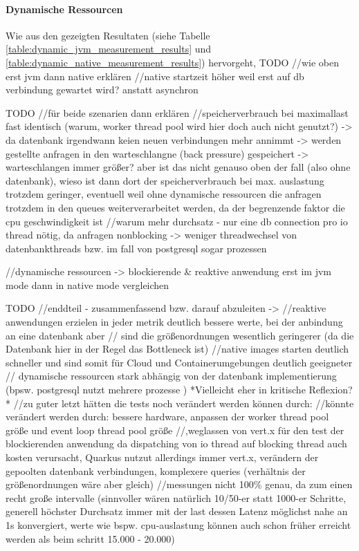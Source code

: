 \paragraph{Dynamische Ressourcen}
Wie aus den gezeigten Resultaten (siehe Tabelle \ref{table:dynamic_jvm_measurement_results} und
\ref{table:dynamic_native_measurement_results}) hervorgeht,
TODO
//wie oben erst jvm dann native erklären
//native startzeit höher weil erst auf db verbindung gewartet wird? anstatt asynchron

TODO
//für beide szenarien dann erklären
//speicherverbrauch bei maximallast fast identisch (warum, worker thread pool wird hier doch auch nicht genutzt?)
-> da datenbank irgendwann keien neuen verbindungen mehr annimmt -> werden gestellte anfragen in den warteschlangne (back pressure)
gespeichert -> warteschlangen immer größer? aber ist das nicht genauso oben der fall (also ohne datenbank), wieso ist dann
dort der speicherverbrauch bei max. auslastung trotzdem geringer, eventuell weil ohne dynamische ressourcen die anfragen
trotzdem in den queues weiterverarbeitet werden, da der begrenzende faktor die cpu geschwindigkeit ist
//warum mehr durchsatz - nur eine db connection pro io thread nötig, da anfragen nonblocking -> weniger threadwechsel
von datenbankthreads bzw. im fall von postgresql sogar prozessen


//dynamische ressourcen -> blockierende \& reaktive anwendung erst im jvm mode dann in native mode vergleichen

TODO
//enddteil - zusammenfassend bzw. darauf abzuleiten ->
//reaktive anwendungen erzielen in jeder metrik deutlich bessere werte, bei der anbindung an eine datenbank aber
// sind die größenordnungen wesentlich geringerer (da die Datenbank hier in der Regel das Bottleneck ist)
//native images starten deutlich schneller und sind somit für Cloud und Containerumgebungen deutlich geeigneter
// dynamische ressourcen stark abhängig von der datenbank implementierung (bpsw. postgresql nutzt mehrere prozesse )
*Vielleicht eher in kritische Reflexion?*
//zu guter letzt hätten die tests noch verändert werden können durch:
//könnte verändert werden durch: bessere hardware, anpassen der worker thread pool größe und event loop thread pool größe
//,weglassen von vert.x für den test der blockierenden anwendung da dispatching von io thread auf blocking thread auch kosten verursacht, Quarkus
nutzut allerdings immer vert.x, verändern der gepoolten datenbank verbindungen, komplexere queries (verhältnis der größenordnungen wäre aber gleich)
//messungen nicht 100\% genau, da zum einen recht große intervalle (sinnvoller wären natürlich 10/50-er statt 1000-er Schritte,
generell höchster Durchsatz immer mit der last dessen Latenz möglichst nahe an 1s konvergiert,
werte wie bspw. cpu-auslastung können auch schon früher erreicht werden als beim schritt 15.000 - 20.000)


